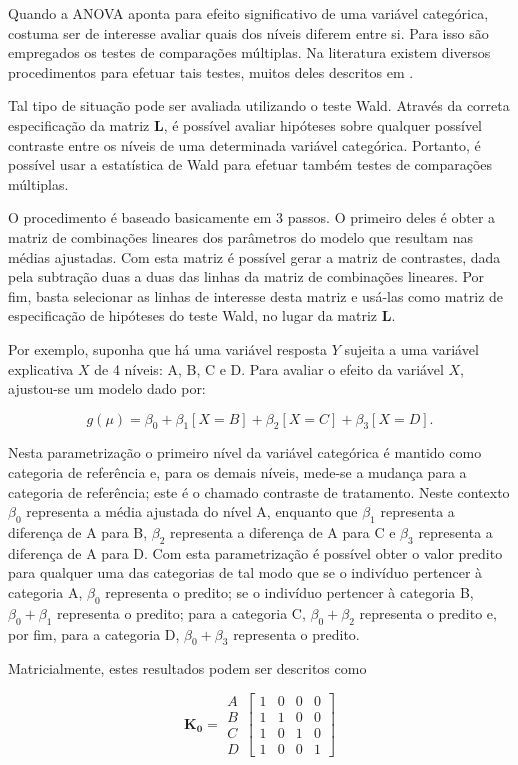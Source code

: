 \documentclass[AMA,STIX1COL]{WileyNJD-v2}
\begin{document}
Quando a ANOVA aponta para efeito significativo de uma variável categórica, costuma ser de interesse avaliar quais dos níveis diferem entre si. Para isso são empregados os testes de comparações múltiplas. Na literatura existem diversos procedimentos para efetuar tais testes, muitos deles descritos em \cite{hsu1996multiple}.

Tal tipo de situação pode ser avaliada utilizando o teste Wald. Através da correta especificação da matriz $\boldsymbol{L}$, é possível avaliar hipóteses sobre qualquer possível contraste entre os níveis de uma determinada variável categórica. Portanto, é possível usar a estatística de Wald para efetuar também testes de comparações múltiplas.

O procedimento é baseado basicamente em 3 passos. O primeiro deles é obter a matriz de combinações lineares dos parâmetros do modelo que resultam nas médias ajustadas. Com esta matriz é possível gerar a matriz de contrastes, dada pela subtração duas a duas das linhas da matriz de combinações lineares. Por fim, basta selecionar as linhas de interesse desta matriz e usá-las como matriz de especificação de hipóteses do teste Wald, no lugar da matriz $\boldsymbol{L}$.
	
Por exemplo, suponha que há uma variável resposta $Y$ sujeita a uma variável explicativa $X$ de 4 níveis: A, B, C e D. Para avaliar o efeito da variável $X$, ajustou-se um modelo dado por:

$$g(\mu) = \beta_0 + \beta_1[X=B] + \beta_2[X=C] + \beta_3[X=D].$$

\noindent Nesta parametrização o primeiro nível da variável categórica é mantido como categoria de referência e, para os demais níveis, mede-se a mudança para a categoria de referência; este é o chamado contraste de tratamento. Neste contexto $\beta_0$ representa a média ajustada do nível A, enquanto que $\beta_1$ representa a diferença de A para B, $\beta_2$ representa a diferença de A para C e $\beta_3$ representa a diferença de A para D. Com esta parametrização é possível obter o valor predito para qualquer uma das categorias de tal modo que se o indivíduo pertencer à categoria A, $\beta_0$ representa o predito; se o indivíduo pertencer à categoria B, $\beta_0 + \beta_1$ representa o predito; para a categoria C, $\beta_0 + \beta_2$ representa o predito e, por fim, para a categoria D, $\beta_0 + \beta_3$ representa o predito.

Matricialmente, estes resultados podem ser descritos como

$$
    \boldsymbol{K_0} = 
      \begin{matrix}
        A\\ 
        B\\ 
        C\\ 
        D 
      \end{matrix} 
    \begin{bmatrix}
      1 & 0 & 0 & 0\\ 
      1 & 1 & 0 & 0\\ 
      1 & 0 & 1 & 0\\ 
      1 & 0 & 0 & 1 
    \end{bmatrix}
$$
\end{document}
